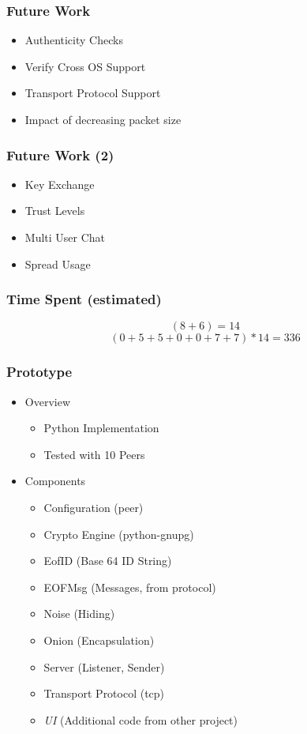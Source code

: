 \documentclass{beamer}
\begin{document}
\frame
{
  \frametitle{Future Work}
  \begin{itemize}
    \item Authenticity Checks
    \item Verify Cross OS Support
    \item Transport Protocol Support
    \item Impact of decreasing packet size
  \end{itemize}
}


\frame
{
  \frametitle{Future Work (2)}
  \begin{itemize}
    \item Key Exchange
    \item Trust Levels
    \item Multi User Chat
    \item Spread Usage
  \end{itemize}
}

\frame
{
  \frametitle{Time Spent (estimated)}
    $$(8+6) = 14$$
    $$(0+5+5+0+0+7+7)*14 = 336$$
}

\frame
{
  \frametitle{Prototype}
  \begin{itemize}
     \item Overview
      \begin{itemize}
          \item Python Implementation
          \item Tested with 10 Peers
      \end{itemize}
      \item Components
      \begin{itemize}
          \item Configuration (peer)
          \item Crypto Engine (python-gnupg)
          \item EofID (Base 64 ID String)
          \item EOFMsg (Messages, from protocol)
          \item Noise (Hiding)
          \item Onion (Encapsulation)
          \item Server (Listener, Sender)
          \item Transport Protocol (tcp)
          \item \textit{UI} (Additional code from other project)
      \end{itemize}
   \end{itemize}
}
\end{document}
